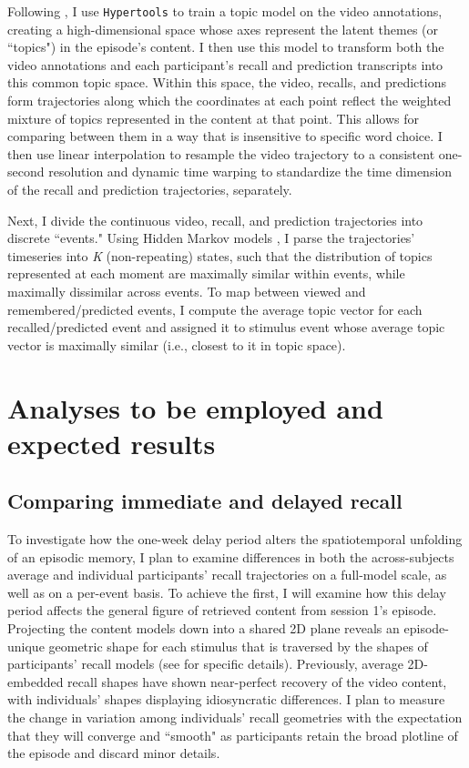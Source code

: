 \documentclass{article}
\begin{document}
Following \cite{HeusEtal18c}, I use \texttt{Hypertools} \citep{HeusEtal18a} to train a topic model \citep{BleiEtal03} on the video annotations, creating a high-dimensional space whose axes represent the latent themes (or ``topics") in the episode's content. I then use this model to transform both the video annotations and each participant's recall and prediction transcripts into this common topic space.  Within this space, the video, recalls, and predictions form trajectories along which the coordinates at each point reflect the weighted mixture of topics represented in the content at that point. This allows for comparing between them in a way that is insensitive to specific word choice.  I then use linear interpolation to resample the video trajectory to a consistent one-second resolution and dynamic time warping \citep{BernClif94} to standardize the time dimension of the recall and prediction trajectories, separately. 

Next, I divide the continuous video, recall, and prediction trajectories into discrete ``events."  Using Hidden Markov models \citep{Rabi89}, I parse the trajectories' timeseries into \textit{K} (non-repeating) states, such that the distribution of topics represented at each moment are maximally similar within events, while maximally dissimilar across events.  To map between viewed and remembered/predicted events, I compute the average topic vector for each recalled/predicted event and assigned it to stimulus event whose average topic vector is maximally similar (i.e., closest to it in topic space).


\section{Analyses to be employed and expected results}
\subsection{Comparing immediate and delayed recall}

To investigate how the one-week delay period alters the spatiotemporal unfolding of an episodic memory, I plan to examine differences in both the across-subjects average and individual participants' recall trajectories on a full-model scale, as well as on a per-event basis.  To achieve the first, I will examine how this delay period affects the general figure of retrieved content from session 1's episode.  Projecting the content models down into a shared 2D plane reveals an episode-unique geometric shape for each stimulus that is traversed by the shapes of participants'  recall models (see \citealp{HeusEtal18c} for specific details).  Previously, average 2D-embedded recall shapes have shown near-perfect recovery of the video content, with individuals' shapes displaying idiosyncratic differences.  I plan to measure the change in variation among individuals' recall geometries with the expectation that they will converge and ``smooth" as participants retain the broad plotline of the episode and discard minor details.
\end{document}
